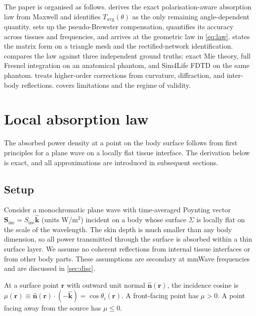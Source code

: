 \documentclass[journal,twocolumn,10pt]{IEEEtran}
\theoremstyle{plain}
\theoremstyle{remark}
\newcommand{\khat}{\hat{\bm{k}}}
\newcommand{\nhat}{\hat{\bm{n}}}
\newcommand{\rr}{\mathbf{r}}
\newcommand{\Sinc}{S_{\mathrm{inc}}}
\newcommand{\Tavg}{T_{\mathrm{avg}}}
\begin{document}
The paper is organised as follows.  derives the exact
polarisation-aware absorption law from Maxwell and identifies
$\Tavg(\theta)$ as the only remaining angle-dependent quantity.
 sets up the pseudo-Brewster compensation,
quantifies its accuracy across tissues and frequencies, and arrives
at the geometric law in \eqref{eq:law}.  states the
matrix form on a triangle mesh and the rectified-network identification.
 compares the law against three independent
ground truths: exact Mie theory, full Fresnel integration on an
anatomical phantom, and Sim4Life FDTD on the same phantom.
 treats higher-order corrections from
curvature, diffraction, and inter-body reflections.
 covers limitations and the regime of validity.


\section{Local absorption law}\label{sec:law}

The absorbed power density at a point on the body surface follows
from first principles for a plane wave on a locally flat tissue
interface. The derivation below is exact, and all approximations are
introduced in subsequent sections.

\subsection{Setup}
Consider a monochromatic plane wave with time-averaged Poynting
vector $\mathbf{S}_{\mathrm{inc}} = \Sinc \khat$ (units W/m$^2$)
incident on a body whose surface $\Sigma$ is locally flat on the
scale of the wavelength. The skin depth is much smaller than any
body dimension, so all power transmitted through the surface is
absorbed within a thin surface layer. We assume no coherent
reflections from internal tissue interfaces or from other body
parts. These assumptions are secondary at mmWave frequencies and are
discussed in \cref{sec:disc}.

At a surface point $\rr$ with outward unit normal $\nhat(\rr)$, the
incidence cosine is $\mu(\rr) \equiv \nhat(\rr) \cdot (-\khat) =
\cos\theta_i(\rr)$. A front-facing point has $\mu > 0$. A point
facing away from the source has $\mu \le 0$.
\end{document}
